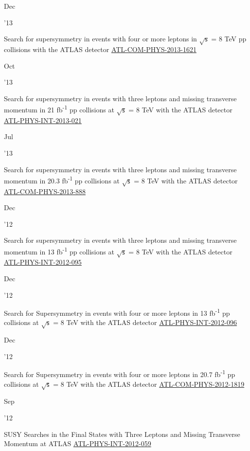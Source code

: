 \documentclass[]{cv} %
\begin{document}
\begin{entrylist}

\entry
{\parbox[t]{\parboxWidthOne}{Dec}\parbox[t]{\parboxWidthTwo}{\hfill '13}}
{Search for supersymmetry in events with four or more leptons in $\sqrt{\mathsf{s}}$ = 8 TeV pp collisions with the ATLAS
detector}
{\href{https://cds.cern.ch/record/1635455}{ATL-COM-PHYS-2013-1621}}
{\vspace*{\spacingPubs}}

\entry
{\parbox[t]{\parboxWidthOne}{Oct}\parbox[t]{\parboxWidthTwo}{\hfill '13}}
{Search for supersymmetry in events with three leptons and missing transverse momentum in 21 fb\textsuperscript{-1} pp collisions
at $\sqrt{\mathsf{s}}$ = 8 TeV with the ATLAS detector}
{\href{https://cds.cern.ch/record/1610185}{ATL-PHYS-INT-2013-021}}
{\vspace*{\spacingPubs}}

\entry
{\parbox[t]{\parboxWidthOne}{Jul}\parbox[t]{\parboxWidthTwo}{\hfill '13}}
{Search for supersymmetry in events with three leptons and missing transverse momentum in 20.3 fb\textsuperscript{-1} pp
collisions at $\sqrt{\mathsf{s}}$ = 8 TeV with the ATLAS detector}
{\href{https://cds.cern.ch/record/1558985}{ATL-COM-PHYS-2013-888}}
{\vspace*{\spacingPubs}}

\entry
{\parbox[t]{\parboxWidthOne}{Dec}\parbox[t]{\parboxWidthTwo}{\hfill '12}}
{Search for supersymmetry in events with three leptons and missing transverse momentum in 13 fb\textsuperscript{-1} pp collisions
at $\sqrt{\mathsf{s}}$ = 8 TeV with the ATLAS detector}
{\href{https://cds.cern.ch/record/1498390}{ATL-PHYS-INT-2012-095}}
{\vspace*{\spacingPubs}}

\entry
{\parbox[t]{\parboxWidthOne}{Dec}\parbox[t]{\parboxWidthTwo}{\hfill '12}}
{Search for Supersymmetry in events with four or more leptons in 13 fb\textsuperscript{-1} pp collisions at $\sqrt{\mathsf{s}}$ =
8 TeV with the ATLAS detector}
{\href{https://cds.cern.ch/record/1498627}{ATL-PHYS-INT-2012-096}}
{\vspace*{\spacingPubs}}

\entry
{\parbox[t]{\parboxWidthOne}{Dec}\parbox[t]{\parboxWidthTwo}{\hfill '12}}
{Search for Supersymmetry in events with four or more leptons in 20.7 fb\textsuperscript{-1} pp collisions at $\sqrt{\mathsf{s}}$
= 8 TeV with the ATLAS detector}
{\href{https://cds.cern.ch/record/1501709}{ATL-COM-PHYS-2012-1819}}
{\vspace*{\spacingPubs}}

\entry
{\parbox[t]{\parboxWidthOne}{Sep}\parbox[t]{\parboxWidthTwo}{\hfill '12}}
{SUSY Searches in the Final States with Three Leptons and Missing Transverse Momentum at ATLAS}
{\href{https://cds.cern.ch/record/1482141}{ATL-PHYS-INT-2012-059}}
{\vspace*{\spacingPubs}}

\end{entrylist}
\fi
\end{document}
